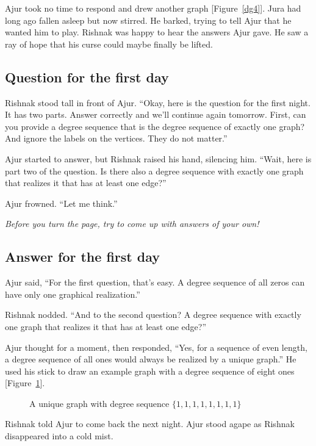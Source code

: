 Ajur took no time to respond and drew another graph [Figure~\ref{dg4}].
Jura had long ago fallen asleep but now stirred. He barked, trying to tell Ajur that he wanted him to play. Rishnak was happy to hear the answers Ajur gave. He saw a ray of hope that his curse could maybe finally be lifted.

\subsection*{Question for the first day}
Rishnak stood tall in front of Ajur.  ``Okay, here is the question for the first night.  It has two parts.  Answer correctly and we'll continue again tomorrow. First, can you provide a degree sequence that is the degree sequence of exactly one graph? And ignore the labels on the vertices. They do not matter.''

Ajur started to answer, but Rishnak raised his hand, silencing him.  ``Wait, here is part two of the question. Is there also a degree sequence with exactly one graph that realizes it that has at least one edge?''

Ajur frowned.  ``Let me think.''

\textit{Before you turn the page, try to come up with answers of your own!}

\newpage
\subsection*{Answer for the first day}
Ajur said, ``For the first question, that's easy.  A degree sequence of all zeros can have only one graphical realization.''

Rishnak nodded. ``And to the second question? A degree sequence with exactly one graph that realizes it that has at least one edge?''

Ajur thought for a moment, then responded, ``Yes, for a sequence of even length, a degree sequence of all ones would always be realized by a unique graph.''
He used his stick to draw an example graph with a degree sequence of eight ones [Figure~\ref{daya1}].

\begin{figure}
\begin{center}
\caption{A unique graph with degree sequence $\{1,1,1,1,1,1,1,1\}$}\label{daya1}
\end{center}
\end{figure}

Rishnak told Ajur to come back the next night. Ajur stood agape as Rishnak disappeared into a cold mist.